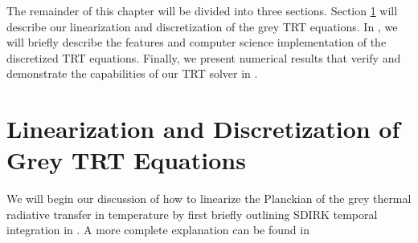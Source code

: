 The remainder of this chapter will be divided into three sections.  Section \ref{sec:chap6_linearization} will describe our linearization and discretization of the grey TRT equations.  
In , we will briefly describe the features and computer science implementation of the discretized TRT equations.  
Finally, we present numerical results that verify and demonstrate the capabilities of our TRT solver in .

\section{Linearization and Discretization of Grey TRT Equations}
\label{sec:chap6_linearization}
We will begin our discussion of how to linearize the Planckian of the grey thermal radiative transfer in temperature by first briefly outlining SDIRK temporal integration in .
A more complete explanation can be found in \cite{alexander}

